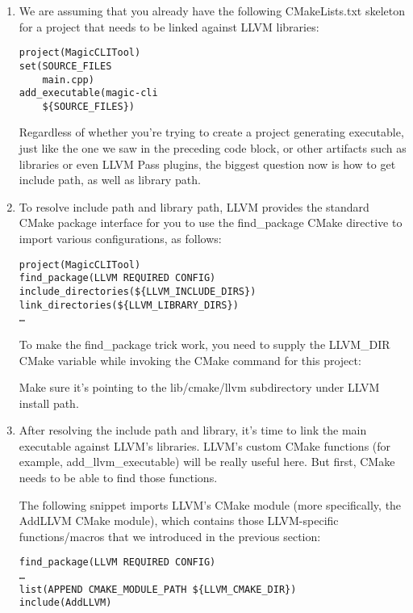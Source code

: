 \begin{enumerate}
\item We are assuming that you already have the following CMakeLists.txt skeleton for a project that needs to be linked against LLVM libraries:

\begin{lstlisting}[style=styleCMake]
project(MagicCLITool)
set(SOURCE_FILES
	main.cpp)
add_executable(magic-cli
	${SOURCE_FILES})
\end{lstlisting}

Regardless of whether you're trying to create a project generating executable, just like the one we saw in the preceding code block, or other artifacts such as libraries or even LLVM Pass plugins, the biggest question now is how to get include path, as well as library path.

\item To resolve include path and library path, LLVM provides the standard CMake package interface for you to use the find\_package CMake directive to import various configurations, as follows:
	
\begin{lstlisting}[style=styleCMake]
project(MagicCLITool)
find_package(LLVM REQUIRED CONFIG)
include_directories(${LLVM_INCLUDE_DIRS})
link_directories(${LLVM_LIBRARY_DIRS})
…
\end{lstlisting}
	
To make the find\_package trick work, you need to supply the LLVM\_DIR CMake variable while invoking the CMake command for this project:

Make sure it's pointing to the lib/cmake/llvm subdirectory under LLVM install path.
	
\item After resolving the include path and library, it's time to link the main executable against LLVM's libraries. LLVM's custom CMake functions (for example, add\_llvm\_executable) will be really useful here. But first, CMake needs to be able to find those functions.

The following snippet imports LLVM's CMake module (more specifically, the AddLLVM CMake module), which contains those LLVM-specific functions/macros that we introduced in the previous section:

\begin{lstlisting}[style=styleCMake]
find_package(LLVM REQUIRED CONFIG)
…
list(APPEND CMAKE_MODULE_PATH ${LLVM_CMAKE_DIR})
include(AddLLVM)
\end{lstlisting}


\end{enumerate}
